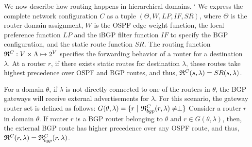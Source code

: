  We now describe how routing
happens in hierarchical domains. 	`
We express the complete network configuration $C$
as a tuple $(\Theta,W,LP,IF,SR)$, where $\Theta$ is
the router domain assignment, $W$ is the OSPF
edge weight function,
the local preference function $LP$  
and the iBGP filter function $IF$ to specify
the BGP configuration, and the static route
function $SR$.  The routing function 
$\mathfrak{R}^C: V \times \Lambda \mapsto 2^V$ 
specifies the forwarding
behavior of a router for a destination $\lambda$.  
At a router $r$, if there exists 
static routes for destination $\lambda$,
these routes take highest precedence over OSPF and BGP routes, 
and thus, $\mathfrak{R}^C(s, \lambda) = SR(s, \lambda)$.

For a domain $\theta$, if $\lambda$ is not directly 
connected to one of the routers in $\theta$, the BGP 
gateways will receive external advertisements for $\lambda$.
For this scenario, the gateway router set is defined as follows: 
$G(\theta, \lambda) = \{r ~|~ \mathfrak{R}^C_{bgp}(r, \lambda) \not= \perp\}$
Consider a router $r$ in domain $\theta$. 
If router $r$ is a BGP router belonging to $\theta$ and $r \in G (\theta, \lambda)$, then, the external BGP route has higher
precedence over any OSPF route, and thus, $\mathfrak{R}^C(r, \lambda)=\mathfrak{R}^C_{bgp}(r, \lambda)$. 

